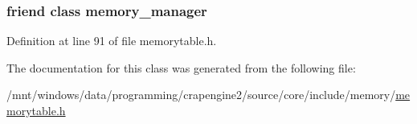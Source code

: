 \subsubsection[{memory\+\_\+manager}]{\setlength{\rightskip}{0pt plus 5cm}friend class {\bf memory\+\_\+manager}\hspace{0.3cm}{\ttfamily [friend]}}\label{classcrap_1_1memory__table__64_a242c93ac6853d673bc3e068a57510842}


Definition at line 91 of file memorytable.\+h.



The documentation for this class was generated from the following file\+:\begin{DoxyCompactItemize}
\item 
/mnt/windows/data/programming/crapengine2/source/core/include/memory/\hyperlink{memorytable_8h}{memorytable.\+h}\end{DoxyCompactItemize}
